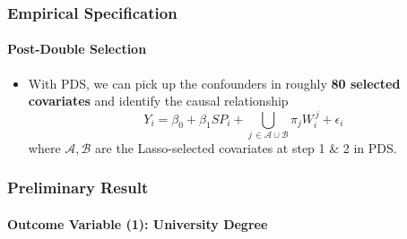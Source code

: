 \documentclass{beamer}
\begin{document}
\begin{frame} %
\frametitle{Empirical Specification}
\framesubtitle{Post-Double Selection}

    \begin{itemize}
        \item With PDS, we can pick up the confounders in roughly \textbf{80 selected covariates} and identify the causal relationship
        \[
        Y_i = \beta_0 + \beta_1 \textit{SP}_i + \bigcup_{j\, \in \mathcal{A} \cup \mathcal{B}} \pi_j W_i^{\,j} + \epsilon_i
        \]
        where $\mathcal{A},\mathcal{B}$ are the Lasso-selected covariates at step 1 \& 2 in PDS.
    \end{itemize}

\end{frame}
    

\begin{frame}[shrink=38] %
\frametitle{Preliminary Result}
\framesubtitle{Outcome Variable (1): University Degree}


\end{frame}
\end{document}
